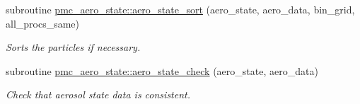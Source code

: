 \begin{DoxyCompactItemize}
subroutine \mbox{\hyperlink{namespacepmc__aero__state_a6626b0ca62809bfeb3137aba559963d1}{pmc\+\_\+aero\+\_\+state\+::aero\+\_\+state\+\_\+sort}} (aero\+\_\+state, aero\+\_\+data, bin\+\_\+grid, all\+\_\+procs\+\_\+same)
\begin{DoxyCompactList}\small\item\em Sorts the particles if necessary. \end{DoxyCompactList}\item 
subroutine \mbox{\hyperlink{namespacepmc__aero__state_a9ce29f42aed338fe38218ecc4bbfa158}{pmc\+\_\+aero\+\_\+state\+::aero\+\_\+state\+\_\+check}} (aero\+\_\+state, aero\+\_\+data)
\begin{DoxyCompactList}\small\item\em Check that aerosol state data is consistent. \end{DoxyCompactList}\end{DoxyCompactItemize}
